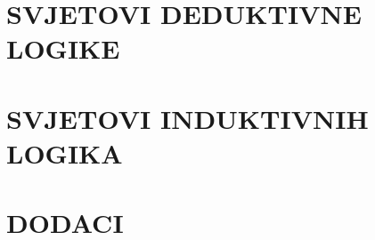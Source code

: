 \documentclass[11pt,a4paper,twoside,openright]{book}
\theoremstyle{definition}
\theoremstyle{plain}
\theoremstyle{remark}
\begin{document}
\part{SVJETOVI DEDUKTIVNE LOGIKE}






\part{SVJETOVI INDUKTIVNIH LOGIKA}




\part{DODACI}

\appendix
 

\backmatter
% 
% 
\end{document}
